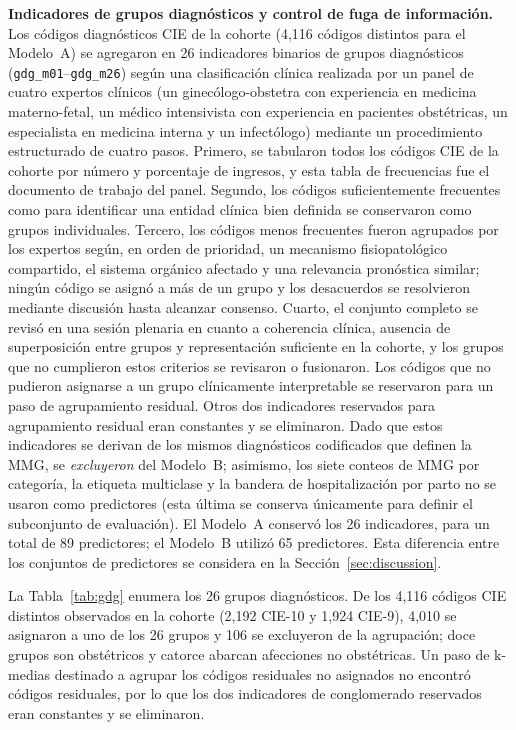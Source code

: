 \documentclass[healthcare,article,submit,pdftex,moreauthors]{Definitions/mdpi_es}
\begin{document}
\textbf{Indicadores de grupos diagnósticos y control de fuga de información.} Los códigos
diagnósticos CIE de la cohorte (4{,}116 códigos distintos para el Modelo~A) se agregaron en 26
indicadores binarios de grupos diagnósticos (\texttt{gdg\_m01}--\texttt{gdg\_m26}) según una
clasificación clínica realizada por un panel de cuatro expertos clínicos (un ginecólogo-obstetra con experiencia en medicina materno-fetal, un médico intensivista con experiencia en pacientes obstétricas, un especialista en medicina interna y un infectólogo) mediante un procedimiento estructurado de cuatro pasos.
Primero, se tabularon todos los códigos CIE de la cohorte por número y porcentaje de ingresos, y esta tabla de frecuencias fue el
documento de trabajo del panel. Segundo, los códigos suficientemente frecuentes como para identificar una entidad clínica bien definida
se conservaron como grupos individuales. Tercero, los códigos menos frecuentes fueron agrupados por los expertos según, en orden de
prioridad, un mecanismo fisiopatológico compartido, el sistema orgánico afectado y una relevancia pronóstica similar; ningún código se
asignó a más de un grupo y los desacuerdos se resolvieron mediante discusión hasta alcanzar consenso. Cuarto, el conjunto completo se revisó
en una sesión plenaria en cuanto a coherencia clínica, ausencia de superposición entre grupos y representación suficiente en la cohorte, y los
grupos que no cumplieron estos criterios se revisaron o fusionaron. Los códigos que no pudieron asignarse a un grupo clínicamente interpretable se
reservaron para un paso de agrupamiento residual.
Otros dos indicadores reservados para agrupamiento residual eran constantes y se eliminaron.
Dado que estos indicadores se derivan de los mismos diagnósticos codificados que definen la
MMG, se \emph{excluyeron} del Modelo~B; asimismo, los siete conteos de MMG por categoría, la
etiqueta multiclase y la bandera de hospitalización por parto no se usaron como predictores
(esta última se conserva únicamente para definir el subconjunto de evaluación).
El Modelo~A conservó los 26 indicadores, para un total de 89 predictores; el Modelo~B utilizó
65 predictores. Esta diferencia entre los conjuntos de predictores se considera en la
Sección~\ref{sec:discussion}.

La Tabla~\ref{tab:gdg} enumera los 26 grupos diagnósticos. De los 4{,}116 códigos CIE distintos
observados en la cohorte (2{,}192 CIE-10 y 1{,}924 CIE-9), 4{,}010 se asignaron a uno de los 26
grupos y 106 se excluyeron de la agrupación; doce grupos son obstétricos y catorce abarcan
afecciones no obstétricas. Un paso de k-medias destinado a agrupar los códigos residuales no
asignados no encontró códigos residuales, por lo que los dos indicadores de conglomerado
reservados eran constantes y se eliminaron.
\end{document}
